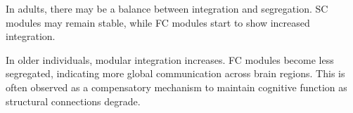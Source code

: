 In adults, there may be a balance between integration and segregation. 
SC modules may remain stable, while FC modules start to show increased integration.

In older individuals, modular integration increases. FC modules become less segregated, 
indicating more global communication across brain regions. 
This is often observed as a compensatory mechanism to maintain cognitive function as 
structural connections degrade.


\cite{Puxeddu2022}
